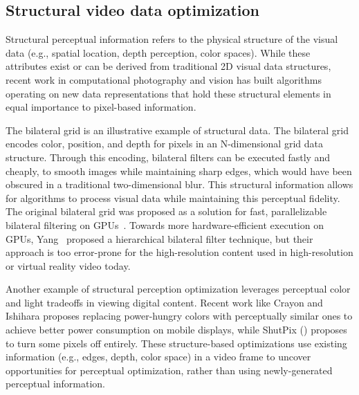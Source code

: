 \subsection{Structural video data optimization}
Structural perceptual information refers to the physical structure of the visual data (e.g., spatial location, depth perception, color spaces).
While these attributes exist or can be derived from traditional 2D visual data structures, recent work in computational photography and vision has built algorithms operating on new data representations that hold these structural elements in equal importance to pixel-based information.

The bilateral grid is an illustrative example of structural data. The bilateral grid encodes color, position, and depth for pixels in an N-dimensional grid data structure.
Through this encoding, bilateral filters can be executed fastly and cheaply, to smooth images while maintaining sharp edges, which would have been obscured in a traditional two-dimensional blur.
This structural information allows for algorithms to process visual data while maintaining this perceptual fidelity.
The original bilateral grid was proposed as a solution for fast, parallelizable bilateral filtering on GPUs~\cite{Chen2007}.
Towards more hardware-efficient execution on GPUs, Yang~\cite{pami_gpu_stereo14} proposed a hierarchical bilateral filter technique, but their approach is too error-prone for the high-resolution content used in high-resolution or virtual reality video today.

Another example of structural perception optimization leverages perceptual color and light tradeoffs in viewing digital content. Recent work like Crayon \cite{crayon} and Ishihara \cite{stanley2018perceived} proposes replacing power-hungry colors with perceptually similar ones to achieve better power consumption on mobile displays, while ShutPix (\cite{Yan:2017:TMP:3123266.3123344}) proposes to turn some pixels off entirely. These structure-based optimizations use existing information (e.g., edges, depth, color space) in a video frame to uncover opportunities for perceptual optimization, rather than using newly-generated perceptual information.

